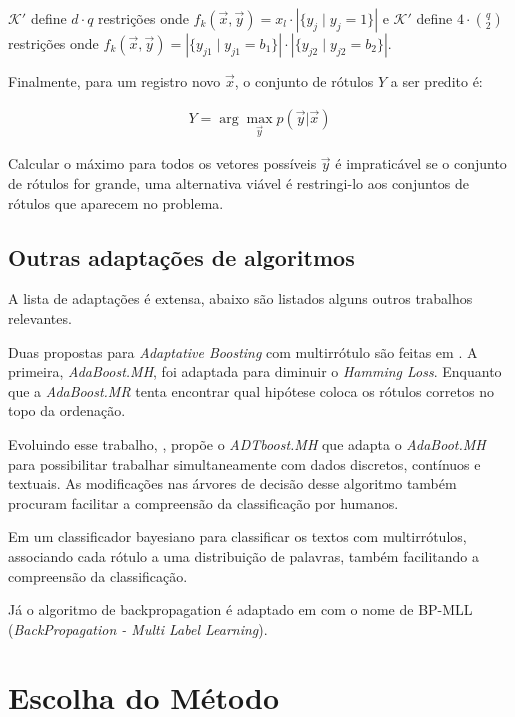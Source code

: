 \documentclass[runningheads,a4paper]{llncs}
\begin{document}
$\mathcal{K'}$ define $d \cdot q$ restrições onde $f_k(\vec{x}, \vec{y}) = x_l \cdot | \{ y_j \mid y_j = 1\} |$ e $\mathcal{K'}$ define $4 \cdot {q \choose 2}$ restrições onde $f_k(\vec{x}, \vec{y}) = |\{ y_{j1} \mid y_{j1} = b_1 \}| \cdot |\{ y_{j2} \mid y_{j2} = b_2 \}|$.

Finalmente, para um registro novo $\vec{x}$, o conjunto de rótulos $Y$ a ser predito é:

\begin{align*}
	Y = \arg \max_{\vec{y}} p(\vec{y} | \vec{x})
\end{align*}

Calcular o máximo para todos os vetores possíveis $\vec{y}$ é impraticável se o conjunto de rótulos for grande, uma alternativa viável é restringi-lo aos conjuntos de rótulos que aparecem no problema.

\subsection{Outras adaptações de algoritmos}

A lista de adaptações é extensa, abaixo são listados alguns outros trabalhos relevantes.

Duas propostas para \textit{Adaptative Boosting} com multirrótulo são feitas em \cite{Schapire2000-yt}. A primeira, \textit{AdaBoost.MH}, foi adaptada para diminuir o \textit{Hamming Loss}. Enquanto que a \textit{AdaBoost.MR} tenta encontrar qual hipótese coloca os rótulos corretos no topo da ordenação.

Evoluindo esse trabalho, \cite{De_Comite2003-lg}, propõe o \textit{ADTboost.MH} que adapta o \textit{AdaBoot.MH} para possibilitar trabalhar simultaneamente com dados discretos, contínuos e textuais. As modificações nas árvores de decisão desse algoritmo também procuram facilitar a compreensão da classificação por humanos.

Em \cite{McCallum1999-iz} um classificador bayesiano para classificar os textos com multirrótulos, associando cada rótulo a uma distribuição de palavras, também facilitando a compreensão da classificação.

Já o algoritmo de backpropagation é adaptado em \cite{Zhang2006-vf} com o nome de BP-MLL (\textit{BackPropagation - Multi Label Learning}).


\section{Escolha do Método} \label{sec:justificativa}
\end{document}
